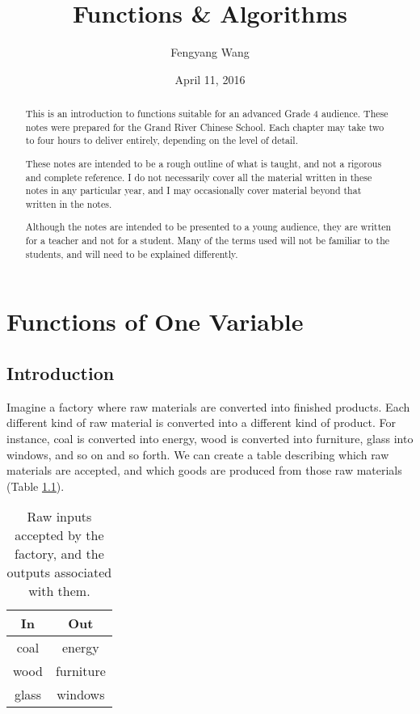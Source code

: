 \documentclass[a4paper,10pt]{report}
\title{Functions \& Algorithms}
\author{Fengyang Wang}
\date{April 11, 2016}
\begin{document}
\begin{abstract}

 This is an introduction to functions suitable for an advanced Grade 4 audience.
 These notes were prepared for the Grand River Chinese School. Each chapter may
 take two to four hours to deliver entirely, depending on the level of detail.

 These notes are intended to be a rough outline of what is taught, and not a
 rigorous and complete reference. I do not necessarily cover all the material
 written in these notes in any particular year, and I may occasionally cover
 material beyond that written in the notes.

 Although the notes are intended to be presented to a young audience, they are
 written for a teacher and not for a student. Many of the terms used will not be
 familiar to the students, and will need to be explained differently.

\end{abstract}

\maketitle

\tableofcontents

\chapter{Functions of One Variable}

\section{Introduction}

Imagine a factory where raw materials are converted into finished products. Each
different kind of raw material is converted into a different kind of product.
For instance, coal is converted into energy, wood is converted into furniture,
glass into windows, and so on and so forth. We can create a table describing
which raw materials are accepted, and which goods are produced from those raw
materials (Table \ref{fov:factory}).

\begin{table}
 \renewcommand{\arraystretch}{1.2}
 \begin{tabular}{|c|c|}
  \hline
  \textbf{In} & \textbf{Out} \\
  \hline
  coal & energy \\
  wood & furniture \\
  glass & windows \\
  \hline
 \end{tabular}

 \caption{Raw inputs accepted by the factory, and the outputs associated with
 them.}
 \label{fov:factory}
\end{table}
\end{document}
